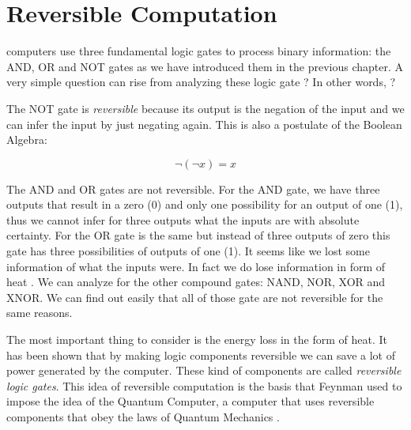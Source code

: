 \section{Reversible Computation}

 computers use three fundamental logic gates to process binary information:
the AND, OR and NOT gates as we have introduced them in the previous chapter. A very simple
question can rise from analyzing these logic gate ? In other words, ?

The NOT gate is \textit{reversible} because its output is the negation of the input and we can infer
the input by just negating again. This is also a postulate of the Boolean Algebra:

\begin{equation}
    \lnot(\lnot x) = x
\end{equation}

The AND and OR gates are not reversible. For the AND gate, we have three outputs
that result in a zero (0) and only one possibility for an output of one (1), thus we cannot infer
for three outputs what the inputs are with absolute certainty. For the OR gate is the same
but instead of three outputs of zero this gate has three possibilities of outputs of one (1).
It seems like we lost some information of what the inputs were. In fact we do lose information
in form of heat \cite{Landauer1961}. We can analyze for the other compound gates: NAND, NOR, XOR
and XNOR. We can find out easily that all of those gate are not reversible for the same reasons.

The most important thing to consider is the energy loss in the form of heat. It has been shown \cite{Bennett1982}
that by making logic components reversible we can save a lot of power generated by the computer.
These kind of components are called \textit{reversible logic gates}. This idea of reversible computation
is the basis that Feynman used to impose the idea of the Quantum Computer, a computer that uses
reversible components that obey the laws of Quantum Mechanics \cite{Feynman1982}.